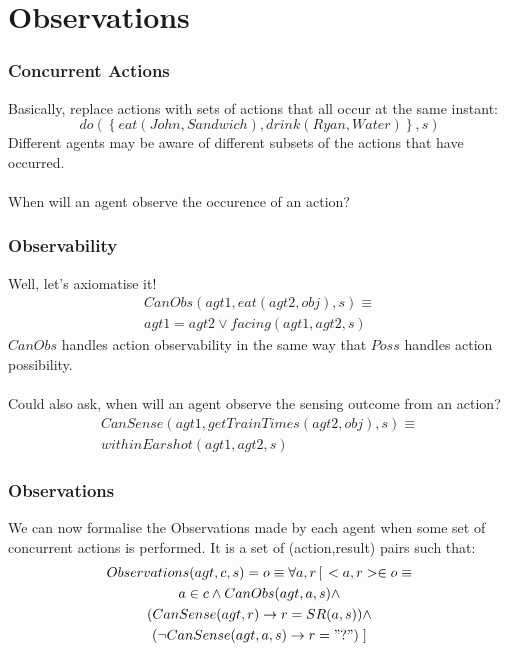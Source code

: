 \documentclass{beamer}
\begin{document}
\section{Observations}

\begin{frame}
\frametitle{Concurrent Actions}
Basically, replace actions with sets of actions that all occur at the same
instant:
\begin{equation*}
  do(\left\{eat(John,Sandwich),drink(Ryan,Water)\right\},s)
\end{equation*}
\pause
Different agents may be aware of different subsets of the actions that
have occurred.
\ \\
\ \\
When will an agent observe the occurence of an action?
\end{frame}

\begin{frame}
\frametitle{Observability}
Well, let's axiomatise it!
\begin{multline*}
  CanObs(agt1,eat(agt2,obj),s) \equiv \\
     agt1=agt2 \vee facing(agt1,agt2,s)
\end{multline*}
$CanObs$ handles action observability in the same way that $Poss$ handles
action possibility.
\ \\
\ \\
\pause
Could also ask, when will an agent observe the sensing outcome from an
action?
\begin{multline*}
  CanSense(agt1,getTrainTimes(agt2,obj),s) \equiv \\ withinEarshot(agt1,agt2,s)
\end{multline*}
\end{frame}

\begin{frame}
\frametitle{Observations}
We can now formalise the Observations made by each agent when some set of
concurrent actions is performed.  It is a set of (action,result) pairs such
that:
\begin{multline*}
Observations(agt,c,s) = o \equiv \forall a,r \left[\right. <a,r> \in o \equiv \\
  a \in c \wedge CanObs(agt,a,s) \wedge \\
  (CanSense(agt,r) \rightarrow r = SR(a,s)) \wedge \\
  (\neg CanSense(agt,a,s) \rightarrow r = "?") \left.\right]
\end{multline*}

\end{frame}
\end{document}
